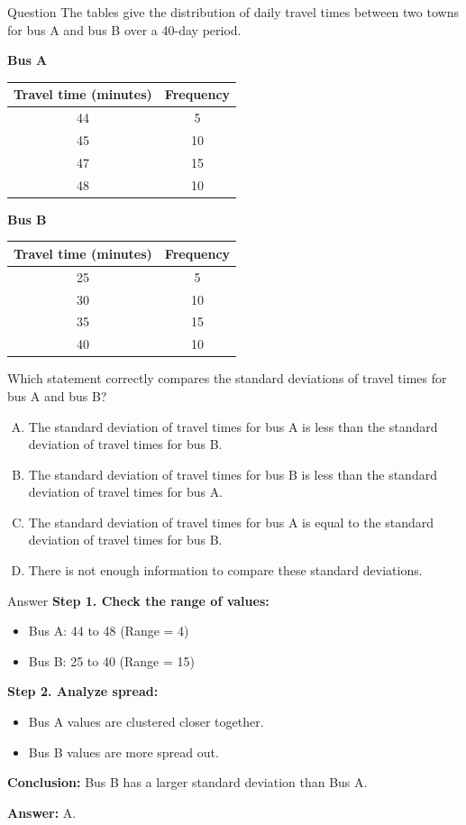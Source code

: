 \documentclass{beamer}
\begin{document}
\begin{frame}{Question}
\scriptsize
The tables give the distribution of daily travel times between two towns for bus A and bus B over a 40-day period.

\begin{center}
\textbf{Bus A}
\begin{tabular}{|c|c|}
\hline
Travel time (minutes) & Frequency \\
\hline
44 & 5 \\
45 & 10 \\
47 & 15 \\
48 & 10 \\
\hline
\end{tabular}
\end{center}

\begin{center}
\textbf{Bus B}
\begin{tabular}{|c|c|}
\hline
Travel time (minutes) & Frequency \\
\hline
25 & 5 \\
30 & 10 \\
35 & 15 \\
40 & 10 \\
\hline
\end{tabular}
\end{center}

Which statement correctly compares the standard deviations of travel times for bus A and bus B?

\begin{enumerate}[A.]
    \item The standard deviation of travel times for bus A is less than the standard deviation of travel times for bus B.
    \item The standard deviation of travel times for bus B is less than the standard deviation of travel times for bus A.
    \item The standard deviation of travel times for bus A is equal to the standard deviation of travel times for bus B.
    \item There is not enough information to compare these standard deviations.
\end{enumerate}
\end{frame}

\begin{frame}{Answer}
\textbf{Step 1. Check the range of values:}
\begin{itemize}
    \item Bus A: 44 to 48 (Range = 4)
    \item Bus B: 25 to 40 (Range = 15)
\end{itemize}

\textbf{Step 2. Analyze spread:}
\begin{itemize}
    \item Bus A values are clustered closer together.
    \item Bus B values are more spread out.
\end{itemize}

\textbf{Conclusion:}
Bus B has a larger standard deviation than Bus A.

\textbf{Answer:} A.
\end{frame}
\end{document}
